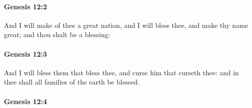 
		\paragraph{Genesis 12:2} %
			\label{GENESIS-12-2}

			And I will make of thee a great nation, and I will bless thee, and make thy name great; and thou shalt be a blessing:


		\paragraph{Genesis 12:3} %
			\label{GENESIS-12-3}

			And I will bless them that bless thee, and curse him that curseth thee: and in thee shall all families of the earth be blessed.


		\paragraph{Genesis 12:4} %
			\label{GENESIS-12-4}

